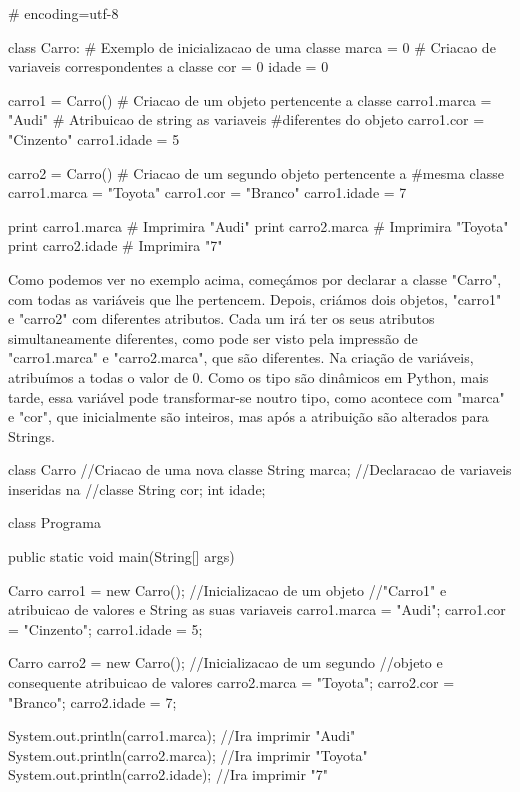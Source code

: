 \documentclass[11pt,openright,twoside]{report}
\begin{document}
\begin{Python}
# encoding=utf-8


class Carro:					# Exemplo de inicializacao de uma classe
    marca = 0					# Criacao de variaveis correspondentes a classe
    cor = 0
    idade = 0

carro1 = Carro()				# Criacao de um objeto pertencente a classe
carro1.marca = "Audi"			# Atribuicao de string as variaveis #diferentes do objeto
carro1.cor = "Cinzento"				
carro1.idade = 5

carro2 = Carro()				# Criacao de um segundo objeto pertencente a #mesma classe
carro1.marca = "Toyota"								
carro1.cor = "Branco"						
carro1.idade = 7

print carro1.marca 				# Imprimira "Audi"
print carro2.marca 				# Imprimira "Toyota"
print carro2.idade 				# Imprimira "7"
\end{Python}
\smallskip

Como podemos ver no exemplo acima, começámos por declarar a classe "Carro", com todas as variáveis que lhe pertencem. Depois, criámos dois objetos, "carro1" e "carro2" com diferentes atributos. Cada um irá ter os seus atributos simultaneamente diferentes, como pode ser visto pela impressão de "carro1.marca" e "carro2.marca", que são diferentes. Na criação de variáveis, atribuímos a todas o valor de 0. Como os tipo são dinâmicos em Python, mais tarde, essa variável pode transformar-se noutro tipo, como acontece com "marca" e "cor", que inicialmente são inteiros, mas após a atribuição são alterados para Strings.
\medskip

\begin{Java}
class Carro {								//Criacao de uma nova classe
   String marca;							//Declaracao de variaveis inseridas na //classe
   String cor;
   int idade;
}

class Programa {

  public static void main(String[] args) { 
	
	Carro carro1 = new Carro();					//Inicializacao de um objeto //"Carro1" e atribuicao de valores e String as suas variaveis
	carro1.marca = "Audi";
	carro1.cor = "Cinzento";
	carro1.idade = 5;
		
	Carro carro2 = new Carro();					//Inicializacao de um segundo //objeto e consequente atribuicao de valores
	carro2.marca = "Toyota";
	carro2.cor = "Branco";
	carro2.idade = 7;

	System.out.println(carro1.marca);			//Ira imprimir "Audi"
	System.out.println(carro2.marca);			//Ira imprimir "Toyota"
	System.out.println(carro2.idade);			//Ira imprimir "7"
	 
  }
}
\end{Java}
\smallskip
\end{document}
